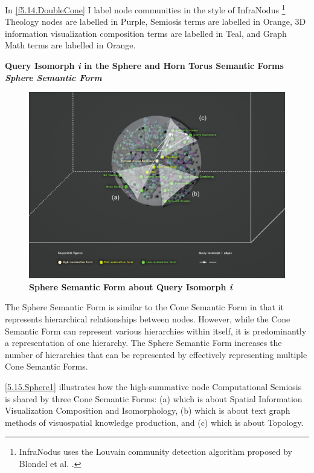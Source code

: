 In \autoref{f5.14.DoubleCone} I label node communities in the style of InfraNodus \citep{paranyushkin_infranodus_2019,paranyushkin_infranodus_nodate-2} \footnote{InfraNodus uses the Louvain community detection algorithm proposed by Blondel et al. \citep{blondel_fast_2008,paranyushkin_force_2022}.} Theology nodes are labelled in Purple, Semiosis terms are labelled in Orange, 3D information visualization composition terms are labelled in Teal, and Graph Math terms are labelled in Orange.

\noindent  \textbf{Query Isomorph \textit{i} in the Sphere and Horn Torus Semantic Forms} 
\\
\textbf{\textit{Sphere Semantic Form}}

\FloatBarrier  
\begin{figure}[h!]
    \centering
    \includegraphics[width=\textwidth]{figures/5.15.Sphere1.png}
    \caption[Sphere Semantic Form about Query Isomorph \textit{i}]{ \textbf{Sphere Semantic Form about Query Isomorph \textit{i}}}
    \label{5.15.Sphere1}
\end{figure}
\FloatBarrier  

The Sphere Semantic Form is similar to the Cone Semantic Form in that it represents hierarchical relationships between nodes. However, while the Cone Semantic Form can represent various hierarchies within itself, it is predominantly a representation of one hierarchy. The Sphere Semantic Form increases the number of hierarchies that can be represented by effectively representing multiple Cone Semantic Forms. 

\autoref{5.15.Sphere1} illustrates how the high-summative node Computational Semiosis is shared by three Cone Semantic Forms: (a) which is about Spatial Information Visualization Composition and Isomorphology, (b) which is about text graph methods of visuospatial knowledge production, and (c) which is about Topology.  

